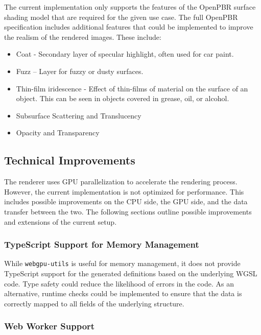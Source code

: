 The current implementation only supports the features of the \gls{OpenPBR} surface shading model that are required for the given use case. The full \gls{OpenPBR} specification includes additional features that could be implemented to improve the realism of the rendered images. These include:

\begin{itemize}
  \item{Coat} - Secondary layer of specular highlight, often used for car paint.
  \item{Fuzz} – Layer for fuzzy or dusty surfaces.
  \item{Thin-film iridescence} - Effect of thin-films of material on the surface of an object. This can be seen in objects covered in grease, oil, or alcohol.
  \item{Subsurface Scattering and Translucency}
  \item{Opacity and Transparency}
\end{itemize}

\subsection*{Technical Improvements}

The renderer uses \gls{GPU} parallelization to accelerate the rendering process. However, the current implementation is not optimized for performance. This includes possible improvements on the \gls{CPU} side, the \gls{GPU} side, and the data transfer between the two. The following sections outline possible improvements and extensions of the current setup.

\subsubsection*{TypeScript Support for Memory Management}

While \texttt{webgpu-utils} \cite{webgpuUtilsLib} is useful for memory management, it does not provide TypeScript support for the generated definitions based on the underlying \gls{WGSL} code. Type safety could reduce the likelihood of errors in the code. As an alternative, runtime checks could be implemented to ensure that the data is correctly mapped to all fields of the underlying structure.

\subsubsection*{Web Worker Support}

